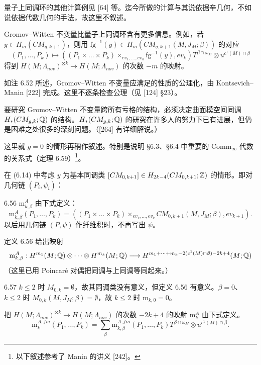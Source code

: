 量子上同调环的其他计算例见 [64] 等。迄今所做的计算与其说依据辛几何，不如说依据代数几何的手法，故这里不叙述。

Gromov–Witten 不变量比量子上同调环含有更多信息。例如，若 $y\in H_m(CM_{g,k+1})$，则用 $\mathrm{fg}^{-1}(y)\in H_m(CM_{g,k+1}(M,J_M;\beta))$ 的对应
\begin{equation}
  (P_1,\dots,P_k)\mapsto\left((P_1\times\dots\times P_k)\times_{ev_1,\dots,ev_k}\mathrm{fg}^{-1}(y),ev_k\right)T^{\beta\cap\omega_M}\otimes u^{c^1(M)\cap\beta} \tag{6.14}
\end{equation}
得到 $H(M;\Lambda_{nov})^{\otimes k}\to H(M;\Lambda_{nov})$ 的次数 $-m$ 的映射。

如注 6.52 所述，Gromov–Witten 不变量应满足的性质的公理化，由 Kontsevich–Manin [222] 完成。这里不逐条检查公理（见 [124] §23）。

要研究 Gromov–Witten 不变量跨所有亏格的结构，必须决定曲面模空间同调 $H_*(CM_{g,k};\mathbb{Q})$ 的结构。$H_*(CM_{g,k};\mathbb{Q})$ 的研究在许多人的努力下已有进展，但仍是困难之处很多的深刻问题。（[264] 有详细解说。）

这里就 $g=0$ 的情形再稍作叙述。特别是说明 §6.3、§6.4 中重要的 Comm$_\infty$ 代数的关系式（定理 6.59）\footnote{以下叙述参考了 Manin 的讲义 [242]。}。

在 (6.14) 中考虑 $y$ 为基本同调类 $[CM_{0,k+1}]\in H_{2k-4}(CM_{0,k+1};\mathbb{Z})$ 的情形。即对几何链 $(P_i,\psi_i)$：

\begin{definition}{6.56}
  $\mathrm{m}_{k,\beta}^A$ 由下式定义：
  \[
    \mathrm{m}_{k,\beta}^A(P_1,\dots,P_k)=\left((P_1\times\dots\times P_k)\times_{ev_1,\dots,ev_k}CM_{0,k+1}(M,J_M;\beta),ev_{k+1}\right).
  \]
  以后用几何链 $(P,\psi)$ 作纤维积时，不再写出 $\psi$。
\end{definition}

定义 6.56 给出映射
\[
  \mathrm{m}_{k,\beta}^A:H^{m_1}(M;\mathbb{Q})\otimes\dots\otimes H^{m_k}(M;\mathbb{Q})\longrightarrow H^{m_1+\dots+m_k-2(c^1(M)\cap\beta)-2k+4}(M;\mathbb{Q})
\]
（这里已用 Poincaré 对偶把同调与上同调等同起来。）

\begin{remark}{6.57}
  $k\le2$ 时 $M_{0,k}=\emptyset$，故其同调类没有意义，但定义 6.56 有意义。$\beta=0$、$k\le2$ 时 $M_{0,k}(M,J_M;\beta)=\emptyset$，故 $k\le2$ 时 $\mathrm{m}_{k,0}=0$。
\end{remark}

把 $H(M;\Lambda_{nov})^{\otimes k}\to H(M;\Lambda_{nov})$ 的次数 $-2k+4$ 的映射 $\mathrm{m}_k^A$ 由下式定义。
\begin{equation}
  \mathrm{m}_k^{A,fm}(P_1,\dots,P_k)=\sum_\beta\mathrm{m}_{k,\beta}^{A,fm}(P_1,\dots,P_k)T^{\beta\cap\omega_M}\otimes u^{c^1(M)\cap\beta}. \tag{6.15}
\end{equation}

